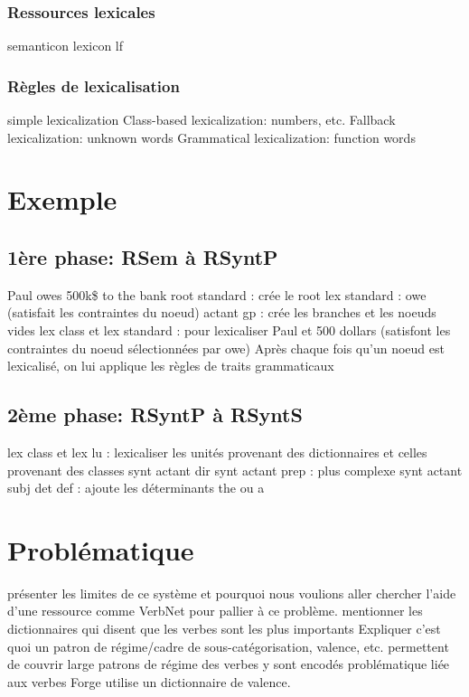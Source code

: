 \subsubsection{Ressources lexicales}
semanticon
lexicon
lf

\subsubsection{Règles de lexicalisation}
simple lexicalization
Class-based lexicalization: numbers, etc.
Fallback lexicalization: unknown words
Grammatical lexicalization: function words



\section{Exemple}
\subsection{1ère phase: RSem à RSyntP}
Paul owes 500k\$ to the bank
root standard : crée le root
lex standard : owe (satisfait les contraintes du noeud)
actant gp : crée les branches et les noeuds vides
lex class et lex standard : pour lexicaliser Paul et 500 dollars (satisfont les contraintes du noeud sélectionnées par owe)
Après chaque fois qu'un noeud est lexicalisé, on lui applique les règles de traits grammaticaux

\subsection{2ème phase: RSyntP à RSyntS}
lex class et lex lu : lexicaliser les unités provenant des dictionnaires et celles provenant des classes
synt actant dir
synt actant prep : plus complexe
synt actant subj
det def : ajoute les déterminants the ou a

\section{Problématique}\label{problema}
présenter les limites de ce système et pourquoi nous voulions aller chercher l'aide d'une ressource comme VerbNet pour pallier à ce problème.
mentionner les dictionnaires qui disent que les verbes sont les plus importants
Expliquer c'est quoi un patron de régime/cadre de sous-catégorisation, valence, etc.
permettent de couvrir large
patrons de régime des verbes y sont encodés
problématique liée aux verbes
Forge utilise un dictionnaire de valence.